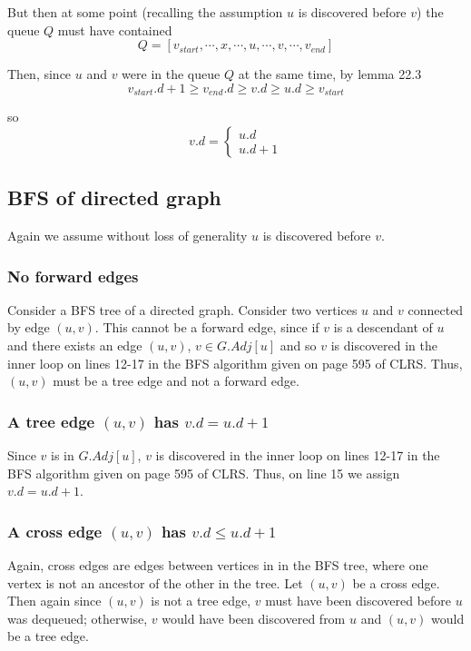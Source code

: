 \documentclass[paper=a4, fontsize=11pt]{scrartcl} %
\numberwithin{equation}{section} %
\numberwithin{figure}{section} %
\numberwithin{table}{section} %
\begin{document}
But then at some point (recalling the assumption $u$ is discovered before $v$) the queue $Q$ must have contained
\[Q = [v_{start}, \cdots, x, \cdots, u, \cdots, v, \cdots, v_{end}]\]

Then, since $u$ and $v$ were in the queue $Q$ at the same time, by lemma 22.3
\[v_{start}.d + 1 \geq v_{end}.d \geq v.d \geq u.d \geq v_{start}\]

so
\[
v.d =
\begin{cases}
	u.d \\
	u.d + 1
\end{cases}
\]

\subsection{BFS of directed graph}
Again we assume without loss of generality $u$ is discovered before $v$.

\subsubsection{No forward edges}

Consider a BFS tree of a directed graph. Consider two vertices $u$ and $v$ connected by edge $(u,v)$. This cannot be a forward edge, since if $v$ is a descendant of $u$ and there exists an edge $(u,v)$, $v \in G.Adj[u]$ and so $v$ is discovered in the inner loop on lines 12-17 in the BFS algorithm given on page 595 of CLRS. Thus, $(u,v)$ must be a tree edge and not a forward edge. 

\subsubsection{A tree edge $(u,v)$ has $v.d = u.d + 1$}

Since $v$ is in $G.Adj[u]$, $v$ is discovered in the inner loop on lines 12-17 in the BFS algorithm given on page 595 of CLRS. Thus, on line 15 we assign $v.d = u.d + 1$.

\subsubsection{A cross edge $(u,v)$ has $v.d \leq u.d + 1$}

Again, cross edges are edges between vertices in in the BFS tree, where one vertex is not an ancestor of the other in the tree. Let $(u,v)$ be a cross edge. Then again since $(u,v)$ is not a tree edge, $v$ must have been discovered before $u$ was dequeued; otherwise, $v$ would have been discovered from $u$ and $(u,v)$ would be a tree edge.
\end{document}
